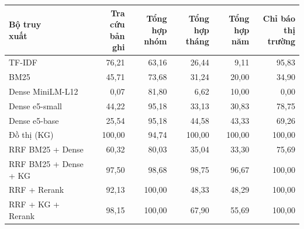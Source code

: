 \begin{tabular}{lrrrrr}
\toprule
\makecell[l]{Bộ truy\\xuất} & \makecell[r]{Tra cứu\\bản ghi} & \makecell[r]{Tổng hợp\\nhóm} & \makecell[r]{Tổng hợp\\tháng} & \makecell[r]{Tổng\\hợp năm} & \makecell[r]{Chỉ báo\\thị trường} \\
\midrule
TF-IDF & 76{,}21 & 63{,}16 & 26{,}44 & 9{,}11 & 95{,}83 \\
BM25 & 45{,}71 & 73{,}68 & 31{,}24 & 20{,}00 & 34{,}90 \\
Dense MiniLM-L12 & 0{,}07 & 81{,}80 & 6{,}62 & 10{,}00 & 0{,}00 \\
Dense e5-small & 44{,}22 & 95{,}18 & 33{,}13 & 30{,}83 & 78{,}75 \\
Dense e5-base & 25{,}54 & 95{,}18 & 44{,}58 & 43{,}33 & 69{,}26 \\
Đồ thị (KG) & 100{,}00 & 94{,}74 & 100{,}00 & 100{,}00 & 100{,}00 \\
RRF BM25 + Dense & 60{,}32 & 80{,}03 & 35{,}04 & 33{,}30 & 75{,}69 \\
RRF BM25 + Dense + KG & 97{,}50 & 98{,}68 & 98{,}75 & 96{,}67 & 100{,}00 \\
RRF + Rerank & 92{,}13 & 100{,}00 & 48{,}33 & 48{,}29 & 100{,}00 \\
RRF + KG + Rerank & 98{,}15 & 100{,}00 & 67{,}90 & 55{,}69 & 100{,}00 \\
\bottomrule
\end{tabular}
